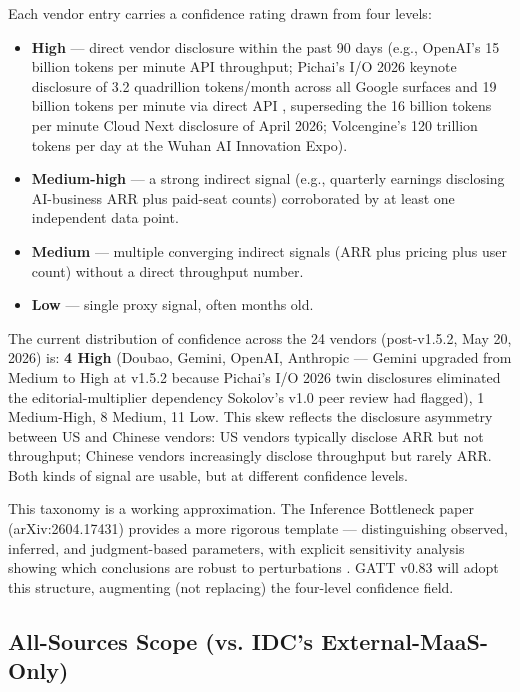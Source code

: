 \documentclass[11pt,a4paper]{article}
\begin{document}
Each vendor entry carries a confidence rating drawn from four levels:

\begin{itemize}
  \item \textbf{High} --- direct vendor disclosure within the past 90 days (e.g., OpenAI's 15 billion tokens per minute API throughput; Pichai's I/O 2026 keynote disclosure of 3.2 quadrillion tokens/month across all Google surfaces and 19 billion tokens per minute via direct API \cite{pichai2026io}, superseding the 16 billion tokens per minute Cloud Next disclosure of April 2026; Volcengine's 120 trillion tokens per day at the Wuhan AI Innovation Expo).
  \item \textbf{Medium-high} --- a strong indirect signal (e.g., quarterly earnings disclosing AI-business ARR plus paid-seat counts) corroborated by at least one independent data point.
  \item \textbf{Medium} --- multiple converging indirect signals (ARR plus pricing plus user count) without a direct throughput number.
  \item \textbf{Low} --- single proxy signal, often months old.
\end{itemize}

The current distribution of confidence across the 24 vendors (post-v1.5.2, May 20, 2026) is: \textbf{4 High} (Doubao, Gemini, OpenAI, Anthropic --- Gemini upgraded from Medium to High at v1.5.2 because Pichai's I/O 2026 twin disclosures eliminated the editorial-multiplier dependency Sokolov's v1.0 peer review had flagged), 1 Medium-High, 8 Medium, 11 Low. This skew reflects the disclosure asymmetry between US and Chinese vendors: US vendors typically disclose ARR but not throughput; Chinese vendors increasingly disclose throughput but rarely ARR. Both kinds of signal are usable, but at different confidence levels.

This taxonomy is a working approximation. The Inference Bottleneck paper (arXiv:2604.17431) provides a more rigorous template --- distinguishing observed, inferred, and judgment-based parameters, with explicit sensitivity analysis showing which conclusions are robust to perturbations \cite{inference2026bottleneck}. GATT v0.83 will adopt this structure, augmenting (not replacing) the four-level confidence field.

\subsection{All-Sources Scope (vs. IDC's External-MaaS-Only)}
\end{document}

